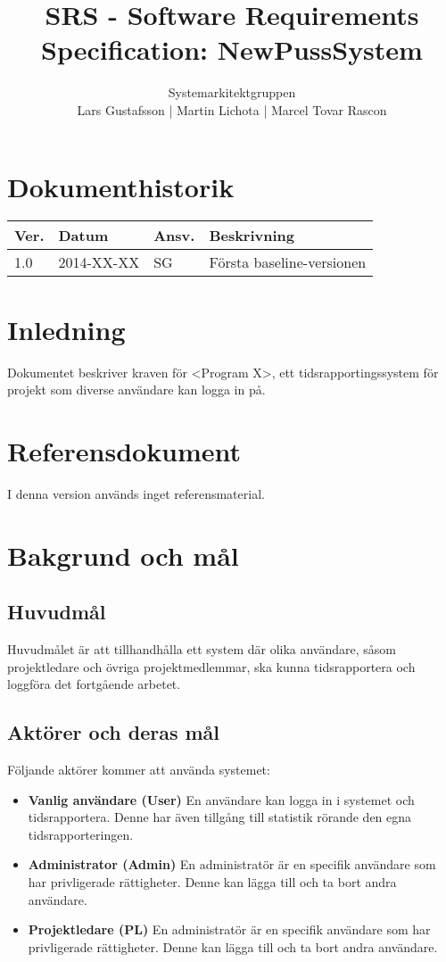 \documentclass[a4paper]{article}
\title{SRS - Software Requirements Specification: NewPussSystem}
\author{Systemarkitektgruppen \\ Lars Gustafsson | Martin Lichota | Marcel Tovar Rascon}
\date{}
\begin{document}
\maketitle
\tableofcontents
\newpage

\section*{Dokumenthistorik}
\begin{tabular}{ l l l l }
Ver. & Datum & Ansv. & Beskrivning \\\hline
1.0 & 2014-XX-XX & SG & Första baseline-versionen

\end{tabular}
\section{Inledning}          %


Dokumentet beskriver kraven för <Program X>, ett tidsrapportingssystem för projekt som diverse användare kan logga in på.


\section{Referensdokument}
I denna version används inget referensmaterial.
\section{Bakgrund och mål}   
\subsection{Huvudmål}
Huvudmålet är att tillhandhålla ett system där olika användare, såsom projektledare och övriga projektmedlemmar, ska kunna tidsrapportera och loggföra det fortgående arbetet. 

\subsection{Aktörer och deras mål}
Följande aktörer kommer att använda systemet:
\begin{itemize}
\item [] \textbf{Vanlig användare (User)} En användare kan logga in i systemet och tidsrapportera. Denne har även tillgång till statistik rörande den egna tidsrapporteringen.
\item [] \textbf{Administrator (Admin)} En administratör är en specifik användare som har privligerade rättigheter. Denne kan lägga till och ta bort andra användare.
\item [] \textbf{Projektledare (PL)} En administratör är en specifik användare som har privligerade rättigheter. Denne kan lägga till och ta bort andra användare.
\end{itemize}
\end{document}
